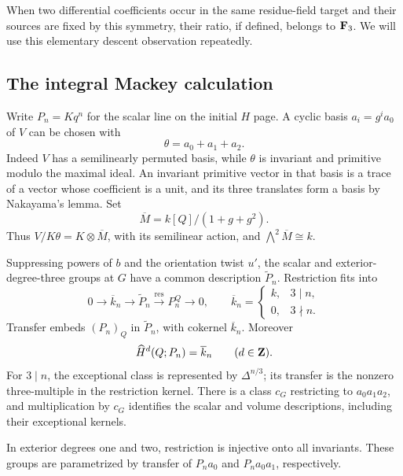 When two differential coefficients occur in the same residue-field
target and their sources are fixed by this symmetry, their ratio,
if defined, belongs to $\mathbf F_3$.  We will use this elementary descent
observation repeatedly.

\subsection{The integral Mackey calculation}

Write $P_n=Kq^n$ for the scalar line on the initial $H$ page.  A
cyclic basis $a_i=g^ia_0$ of $V$ can be chosen with
\[
 \theta=a_0+a_1+a_2.
\]
Indeed $V$ has a semilinearly permuted basis, while $\theta$ is
invariant and primitive modulo the maximal ideal.  An invariant
primitive vector in that basis is a trace of a vector whose
coefficient is a unit, and its three translates form a basis by
Nakayama's lemma.  Set
\[
 \overline M=k[Q]/(1+g+g^2).
\]
Thus $V/K\theta=K\otimes\overline M$, with its semilinear action,
and $\bigwedge^2\overline M\cong k$.

\begin{lemma}\label{g:mackey}
Suppressing powers of $b$ and the orientation twist $u'$, the scalar
and exterior-degree-three groups at $G$ have a common description
$\widetilde P_n$.  Restriction fits into
\[
 0\longrightarrow \overline k_n\longrightarrow
 \widetilde P_n\xrightarrow{\operatorname{res}}P_n^Q
 \longrightarrow0,
 \qquad
 \overline k_n=
 \begin{cases}k,&3\mid n,\\0,&3\nmid n.
 \end{cases}
\]
Transfer embeds $(P_n)_Q$ in $\widetilde P_n$, with cokernel
$\overline k_n$.  Moreover
\begin{equation}\label{g:P-tate}
 \widehat H^d(Q;P_n)=\overline k_n
 \qquad(d\in\mathbf Z).
\end{equation}
For $3\mid n$, the exceptional class is represented by
$\Delta^{n/3}$; its transfer is the nonzero three-multiple in the
restriction kernel.  There is a class $c_G$ restricting to
$a_0a_1a_2$, and multiplication by $c_G$ identifies the scalar and
volume descriptions, including their exceptional kernels.

In exterior degrees one and two, restriction is injective onto all
invariants.  These groups are parametrized by transfer of
$P_na_0$ and $P_na_0a_1$, respectively.
\end{lemma}

